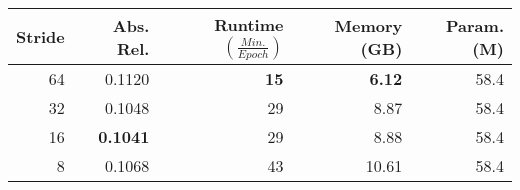 \begin{tabular}{rrrrr}
\toprule
Stride &  Abs. Rel. & Runtime {\tiny $\left(\frac{Min.}{Epoch}\right)$} & Memory (GB) & Param. (M) \\
\midrule
64 &    0.1120 & \textbf{15}  &     \textbf{6.12} &  58.4 \\
32 &    0.1048 &  29  &     8.87 &  58.4 \\
16 &    \textbf{0.1041} &  29  &     8.88 &  58.4 \\
8 &     0.1068 &  43  &    10.61 &  58.4 \\
\bottomrule
\end{tabular}
